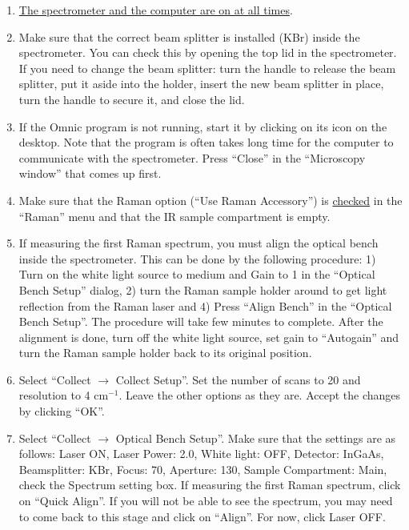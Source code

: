 \documentclass[byrevtex,amssymb,aps,pra,floatfix,letterpaper]{revtex4}
\begin{document}
\begin{enumerate}
\item \underline{The spectrometer and the computer are on at all times}.

\item Make sure that the correct beam splitter is installed (KBr) inside the spectrometer. You can check this by opening the top lid in the spectrometer. If you need to change the beam splitter: turn the handle to release the beam splitter, put it aside into the holder, insert the new beam splitter in place, turn the handle to secure it, and close the lid.

\item If the Omnic program is not running, start it by clicking on its icon on the desktop. Note that the program is often takes long time for the computer to communicate with the spectrometer. Press ``Close'' in the ``Microscopy window'' that comes up first.

\item Make sure that the Raman option (``Use Raman Accessory'') is \underline{checked} in the ``Raman'' menu and that the IR sample compartment is empty.

\item If measuring the first Raman spectrum, you must align the optical bench inside the spectrometer. This can be done by the following procedure: 1) Turn on the white light source to medium and Gain to 1 in the ``Optical Bench Setup'' dialog, 2) turn the Raman sample holder around to get light reflection from the Raman laser and 4) Press ``Align Bench'' in the ``Optical Bench Setup''. The procedure will take few minutes to complete. After the alignment is done, turn off the white light source, set gain to ``Autogain'' and turn the Raman sample holder back to its original position.

\item Select ``Collect $\to$ Collect Setup''. Set the number of scans to 20 and resolution to 4 cm$^{-1}$. Leave the other options as they are. Accept the changes by clicking ``OK''.

\item Select ``Collect $\to$ Optical Bench Setup''. Make sure that the settings are as follows: Laser ON, Laser Power: 2.0, White light: OFF, Detector: InGaAs, Beamsplitter: KBr, Focus: 70, Aperture: 130, Sample Compartment: Main, check the Spectrum setting box. If measuring the first Raman spectrum, click on ``Quick Align''. If you will not be able to see the spectrum, you may need to come back to this stage and click on ``Align''. For now, click Laser OFF.


\end{enumerate}
\end{document}
